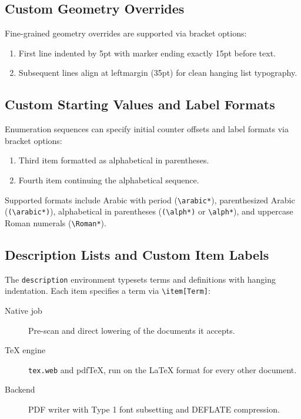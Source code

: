 \documentclass[11pt, a4paper]{article}
\begin{document}
\subsection{Custom Geometry Overrides}
Fine-grained geometry overrides are supported via bracket options:

\begin{enumerate}[labelsep=15pt, leftmargin=35pt, itemindent=5pt]
\item First line indented by 5pt with marker ending exactly 15pt before text.
\item Subsequent lines align at leftmargin (35pt) for clean hanging list typography.
\end{enumerate}

\subsection{Custom Starting Values and Label Formats}
Enumeration sequences can specify initial counter offsets and label formats via bracket options:

\begin{enumerate}[start=3, label=(\alph*)]
\item Third item formatted as alphabetical in parentheses.
\item Fourth item continuing the alphabetical sequence.
\end{enumerate}

Supported formats include Arabic with period (\verb|\arabic*|), parenthesized Arabic (\verb|(\arabic*)|), alphabetical in parentheses (\verb|(\alph*)| or \verb|\alph*|), and uppercase Roman numerals (\verb|\Roman*|).

\subsection{Description Lists and Custom Item Labels}
The \texttt{description} environment typesets terms and definitions with hanging indentation. Each item specifies a term via \verb|\item[Term]|:

\begin{description}
\item[Native job] Pre-scan and direct lowering of the documents it accepts.
\item[TeX engine] \texttt{tex.web} and pdfTeX, run on the LaTeX format for every other document.
\item[Backend] PDF writer with Type 1 font subsetting and DEFLATE compression.
\end{description}
\end{document}
